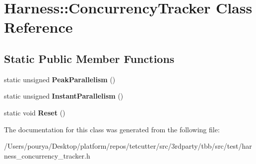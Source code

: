 \hypertarget{classHarness_1_1ConcurrencyTracker}{}\section{Harness\+:\+:Concurrency\+Tracker Class Reference}
\label{classHarness_1_1ConcurrencyTracker}
\subsection*{Static Public Member Functions}
\begin{DoxyCompactItemize}
\item 
\hypertarget{classHarness_1_1ConcurrencyTracker_ab30286b932e0856c8329a059b3875b38}{}static unsigned {\bfseries Peak\+Parallelism} ()\label{classHarness_1_1ConcurrencyTracker_ab30286b932e0856c8329a059b3875b38}

\item 
\hypertarget{classHarness_1_1ConcurrencyTracker_ad84970a85fe942c5cda5380fd09dee34}{}static unsigned {\bfseries Instant\+Parallelism} ()\label{classHarness_1_1ConcurrencyTracker_ad84970a85fe942c5cda5380fd09dee34}

\item 
\hypertarget{classHarness_1_1ConcurrencyTracker_a246884e98e5a47fe34ec60da871fb43b}{}static void {\bfseries Reset} ()\label{classHarness_1_1ConcurrencyTracker_a246884e98e5a47fe34ec60da871fb43b}

\end{DoxyCompactItemize}


The documentation for this class was generated from the following file\+:\begin{DoxyCompactItemize}
\item 
/\+Users/pourya/\+Desktop/platform/repos/tetcutter/src/3rdparty/tbb/src/test/harness\+\_\+concurrency\+\_\+tracker.\+h\end{DoxyCompactItemize}
